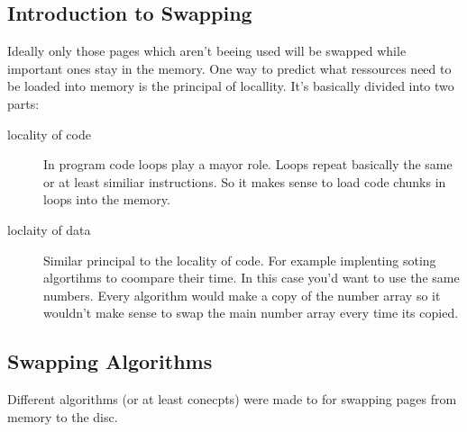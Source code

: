 \documentclass[a4paper]{scrartcl}
\begin{document}
            \subsection{Introduction to Swapping}
                Ideally only those pages which aren't beeing used will be swapped while important ones stay in the memory. One way to predict what ressources need to be loaded into memory 
                is the principal of locallity. It's basically divided into two parts: 
                \begin{description}
                    \item[locality of code] In program code loops play a mayor role. Loops repeat basically the same or at least similiar instructions. So it makes sense to load code chunks in loops into the memory.
                    \item[loclaity of data] Similar principal to the locality of code. For example implenting soting algortihms to coompare their time. In this case you'd want to use the same numbers. 
                    Every algorithm would make a copy of the number array so it wouldn't make sense to swap the main number array every time its copied.  
                \end{description}
            \subsection{Swapping Algorithms}
                Different algorithms (or at least conecpts) were made to for swapping pages from memory to the disc.
\end{document}
